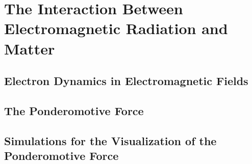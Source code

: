 \documentclass[12pt, class=report, crop=false]{standalone}
\begin{document}
\chapter{The Interaction Between Electromagnetic Radiation and Matter}%
\label{chap:light-matter-interaction}

\section{Electron Dynamics in Electromagnetic Fields}
\section{The Ponderomotive Force}
\section{Simulations for the Visualization of the Ponderomotive Force}
\end{document}

